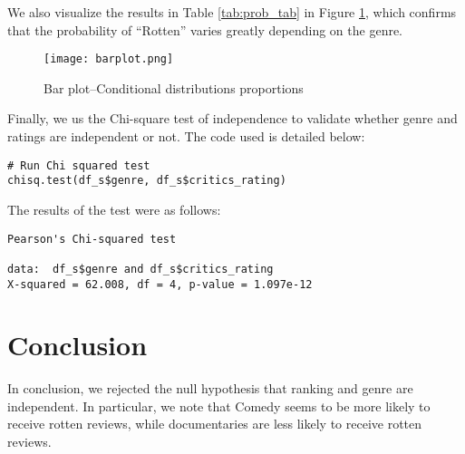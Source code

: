 \documentclass[12pt,a4paper]{article}
\begin{document}
We also visualize the results in Table \ref{tab:prob_tab} in Figure \ref{fig:barplot}, which  confirms that the probability of ``Rotten'' varies greatly depending on the genre. 

\begin{figure}[H] %
\centering
\texttt{[image: barplot.png]}
\caption{Bar plot--Conditional distributions proportions}
\label{fig:barplot}
\end{figure} 

Finally, we us the Chi-square test of independence to validate whether genre and ratings are independent or not. The code used is detailed below:

\begin{verbatim}
# Run Chi squared test
chisq.test(df_s$genre, df_s$critics_rating)
\end{verbatim}

The results of the test were as follows:

\begin{verbatim}
Pearson's Chi-squared test

data:  df_s$genre and df_s$critics_rating
X-squared = 62.008, df = 4, p-value = 1.097e-12
\end{verbatim}

\section{Conclusion}

In conclusion, we rejected the null hypothesis that ranking and genre are  independent. In particular, we note that Comedy seems to be more likely to receive rotten reviews, while documentaries are less likely to receive rotten reviews. 
\end{document}
